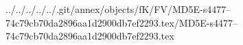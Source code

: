 ../../../../../.git/annex/objects/fK/FV/MD5E-s4477--74c79cb70da2896aa1d2900db7ef2293.tex/MD5E-s4477--74c79cb70da2896aa1d2900db7ef2293.tex